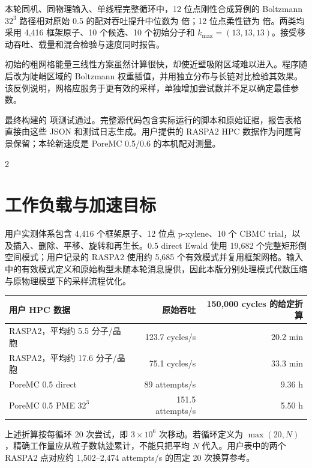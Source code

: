 \documentclass[11pt,a4paper]{article}
\begin{document}
本轮同机、同物理输入、单线程完整循环中，12 位点刚性合成算例的 Boltzmann $32^3$ 路径相对原始 0.5 的配对吞吐提升中位数为 \RigidSpeed{} 倍；12 位点柔性链为 \FlexibleSpeed{} 倍。两类均采用 4,416 框架原子、10 个候选、10 个初始分子和 $k_{\max}=(13,13,13)$。接受移动吞吐、载量和混合检验与速度同时报告。

初始的粗网格能量三线性方案虽然计算很快，却使近壁吸附区域难以进入。程序随后改为陡峭区域的 Boltzmann 权重插值，并用独立分布与长链对比检验其效果。该反例说明，网格应服务于更有效的采样，单独增加尝试数并不足以确定最佳参数。

最终构建的 \TotalTests{} 项测试通过。完整源代码包含实际运行的脚本和原始证据，报告表格直接由这些 JSON 和测试日志生成。用户提供的 RASPA2 HPC 数据作为问题背景保留；本轮新速度是 PoreMC 0.5/0.6 的本机配对测量。

\setcounter{tocdepth}{1}
\begingroup\small\begin{multicols}{2}\tableofcontents\end{multicols}\endgroup
\clearpage

\section{工作负载与加速目标}
用户实测体系包含 4,416 个框架原子、12 位点 p-xylene、10 个 CBMC trial，以及插入、删除、平移、旋转和再生长。0.5 direct Ewald 使用 19,682 个完整矩形倒空间模式；用户记录的 RASPA2 使用约 5,685 个有效模式并复用框架网格。输入中的有效模式定义和原始构型未随本轮消息提供，因此本版分别处理模式代数压缩与原物理模型下的采样流程优化。

\begin{center}\small
\begin{tabular}{@{}lrr@{}}\toprule
用户 HPC 数据 & 原始吞吐 & 150,000 cycles 的给定折算\\\midrule
RASPA2，平均约 5.5 分子/晶胞 & 123.7 cycles/s & 20.2 min\\
RASPA2，平均约 17.6 分子/晶胞 & 75.1 cycles/s & 33.3 min\\
PoreMC 0.5 direct & 89 attempts/s & 9.36 h\\
PoreMC 0.5 PME $32^3$ & 151.5 attempts/s & 5.50 h\\\bottomrule
\end{tabular}\end{center}

上述折算按每循环 20 次尝试，即 $3\times10^6$ 次移动。若循环定义为 $\max(20,N)$，精确工作量应从粒子数轨迹累计，不能只把平均 $N$ 代入。用户表中的两个 RASPA2 点对应约 1,502--2,474 attempts/s 的固定 20 次换算参考。
\end{document}
